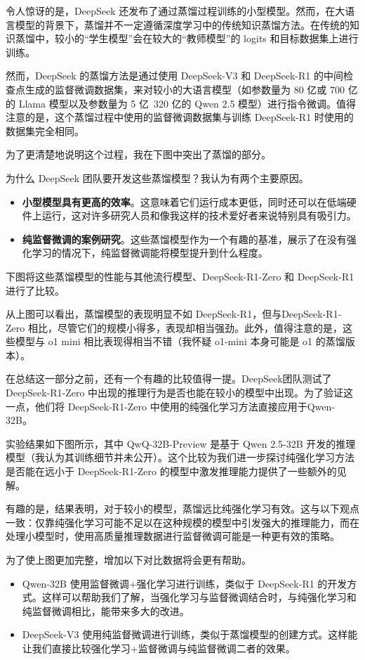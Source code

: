 \documentclass[lang=cn,newtx,10pt,scheme=chinese]{elegantbook}
\begin{document}
令人惊讶的是，DeepSeek 还发布了通过蒸馏过程训练的小型模型。然而，在大语言模型的背景下，蒸馏并不一定遵循深度学习中的传统知识蒸馏方法。在传统的知识蒸馏中，较小的``学生模型''会在较大的``教师模型''的 logits 和目标数据集上进行训练。

然而，DeepSeek 的蒸馏方法是通过使用 DeepSeek-V3 和 DeepSeek-R1 的中间检查点生成的监督微调数据集，来对较小的大语言模型（如参数量为 80 亿或 700 亿的 Llama 模型以及参数量为 5 亿~320 亿的 Qwen 2.5 模型）进行指令微调。值得注意的是，这个蒸馏过程中使用的监督微调数据集与训练 DeepSeek-R1 时使用的数据集完全相同。

为了更清楚地说明这个过程，我在下图中突出了蒸馏的部分。

为什么 DeepSeek 团队要开发这些蒸馏模型？我认为有两个主要原因。

\begin{itemize}
\item \textbf{小型模型具有更高的效率}。这意味着它们运行成本更低，同时还可以在低端硬件上运行，这对许多研究人员和像我这样的技术爱好者来说特别具有吸引力。
\item \textbf{纯监督微调的案例研究}。这些蒸馏模型作为一个有趣的基准，展示了在没有强化学习的情况下，纯监督微调能将模型提升到什么程度。
\end{itemize}

下图将这些蒸馏模型的性能与其他流行模型、DeepSeek-R1-Zero 和 DeepSeek-R1 进行了比较。

从上图可以看出，蒸馏模型的表现明显不如 DeepSeek-R1，但与DeepSeek-R1-Zero 相比，尽管它们的规模小得多，表现却相当强劲。此外，值得注意的是，这些模型与 o1 mini 相比表现得相当不错（我怀疑 o1-mini 本身可能是 o1 的蒸馏版本）。

在总结这一部分之前，还有一个有趣的比较值得一提。DeepSeek团队测试了 DeepSeek-R1-Zero 中出现的推理行为是否也能在较小的模型中出现。为了验证这一点，他们将 DeepSeek-R1-Zero 中使用的纯强化学习方法直接应用于Qwen-32B。

实验结果如下图所示，其中 QwQ-32B-Preview 是基于 Qwen 2.5-32B 开发的推理模型（我认为其训练细节并未公开）。这个比较为我们进一步探讨纯强化学习方法是否能在远小于 DeepSeek-R1-Zero 的模型中激发推理能力提供了一些额外的见解。

有趣的是，结果表明，对于较小的模型，蒸馏远比纯强化学习有效。这与以下观点一致：仅靠纯强化学习可能不足以在这种规模的模型中引发强大的推理能力，而在处理小模型时，使用高质量推理数据进行监督微调可能是一种更有效的策略。

为了使上图更加完整，增加以下对比数据将会更有帮助。

\begin{itemize}
\item Qwen-32B 使用监督微调+强化学习进行训练，类似于 DeepSeek-R1 的开发方式。这样可以帮助我们了解，当强化学习与监督微调结合时，与纯强化学习和纯监督微调相比，能带来多大的改进。
\item DeepSeek-V3 使用纯监督微调进行训练，类似于蒸馏模型的创建方式。这样能让我们直接比较强化学习+监督微调与纯监督微调二者的效果。
\end{itemize}
\end{document}

